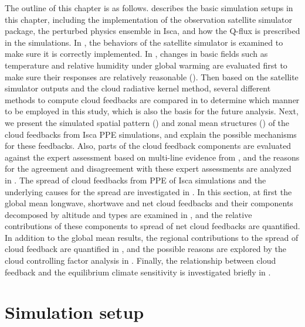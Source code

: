 The outline of this chapter is as follows.  describes the basic simulation setups in this chapter, including the implementation of the observation satellite simulator package, the perturbed physics ensemble in Isca, and how the Q-flux is prescribed in the simulations. In , the behaviors of the satellite simulator is examined to make sure it is correctly implemented. In , changes in basic fields such as temperature and relative humidity under global warming are evaluated first to make sure their responses are relatively reasonable (). Then based on the satellite simulator outputs and the cloud radiative kernel method, several different methods to compute cloud feedbacks are compared in  to determine which manner to be employed in this study, which is also the basis for the future analysis. Next, we present the simulated spatial pattern () and zonal mean structures () of the cloud feedbacks from Isca PPE simulations, and explain the possible mechanisms for these feedbacks. Also, parts of the cloud feedback components are evaluated against the expert assessment based on multi-line evidence from \cite{Sherwood2020}, and the reasons for the agreement and disagreement with these expert assessments are analyzed in . The spread of cloud feedbacks from PPE of Isca simulations and the underlying causes for the spread are investigated in . In this section, at first the global mean longwave, shortwave and net cloud feedbacks and their components decomposed by altitude and types are examined in , and the relative contributions of these components to spread of net cloud feedbacks are quantified. In addition to the global mean results, the regional contributions to the spread of cloud feedback are quantified in , and the possible reasons are explored by the cloud controlling factor analysis in . Finally, the relationship between cloud feedback and the equilibrium climate sensitivity is investigated briefly in .

\section{Simulation setup}
\label{sec:simulation_setup_cld_fbk}

